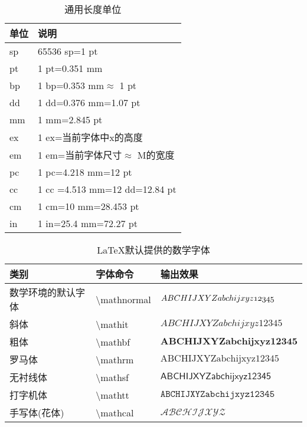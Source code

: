 \documentclass[UTF8,fontset=ubuntu]{ctexart}
\begin{document}
\begin{table}[H]
\begin{tabular}{l l}
	\hline
	单位 & 说明\\
	\hline
	sp & 65536 sp=1 pt\\
	pt & 1 pt=0.351 mm\\
	bp & 1 bp=0.353 mm$\approx$ 1 pt\\
	dd & 1 dd=0.376 mm=1.07 pt\\
	mm & 1 mm=2.845 pt\\
	ex & 1 ex=当前字体中x的高度\\
	em & 1 em=当前字体尺寸$\approx$ M的宽度\\
	pc & 1 pc=4.218 mm=12 pt\\
	cc & 1 cc =4.513 mm=12 dd=12.84 pt\\
	cm & 1 cm=10 mm=28.453 pt\\
	in & 1 in=25.4 mm=72.27 pt\\
	\hline
\end{tabular}
\caption{通用长度单位}
\end{table}

\begin{table}[H]
\begin{minipage}{\textwidth}
\begin{tabular}{l l l}
	\hline
	类别 & 字体命令 & 输出效果\\\hline
	数学环境的默认字体 & \textbackslash  mathnormal & $\mathnormal{ABCHIJXYZabchijxyz12345}$\\
	斜体 & \textbackslash  mathit & $\mathit{ABCHIJXYZabchijxyz12345}$\\
	粗体 & \textbackslash  mathbf & $\mathbf{ABCHIJXYZabchijxyz12345}$\\
	罗马体 & \textbackslash  mathrm & $\mathrm{ABCHIJXYZabchijxyz12345}$\\
	无衬线体 & \textbackslash  mathsf & $\mathsf{ABCHIJXYZabchijxyz12345}$\\
	打字机体 & \textbackslash  mathtt & $\mathtt{ABCHIJXYZabchijxyz12345}$\\
	手写体(花体)\footnotemark[1] & \textbackslash mathcal & $\mathcal{ABCHIJXYZ}$\\\hline
\end{tabular}
\end{minipage}
\caption{LaTeX默认提供的数学字体}
\end{table}
\end{document}

